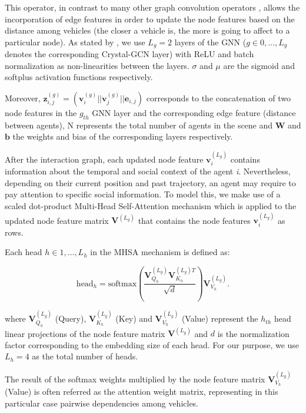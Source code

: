 This operator, in contrast to many other graph convolution operators \cite{zeng2021lanercnn} \cite{liang2020learning}, allows the incorporation of edge features in order to update the node features based on the distance among vehicles (the closer a vehicle is, the more is going to affect to a particular node). As stated by \cite{schmidt2022crat}, we use $L_g = 2$ layers of the GNN ($g \in 0, \dots , L_g$ denotes the corresponding Crystal-GCN layer) with ReLU and batch normalization as non-linearities between the layers. $\sigma$ and $\mu$ are the sigmoid and softplus activation functions respectively. 

Moreover, $\mathbf{z}_{i,j}^{(g)} = ( \mathbf{v}_i^{(g)} || \mathbf{v}_j^{(g)} ||\mathbf{e}_{i,j} )$ corresponds to the concatenation of two node features in the \textit{$g_{th}$} GNN layer and the corresponding edge feature (distance between agents), N represents the total number of agents in the scene and $\mathbf{W}$ and $\mathbf{b}$ the weights and bias of the corresponding layers respectively.

After the interaction graph, each updated node feature $\mathbf{v}_i^{(L_g)}$ contains information about the temporal and social context of the agent \textit{i}. Nevertheless, depending on their current position and past trajectory, an agent may require to pay attention to specific social information. To model this, we make use of a scaled dot-product Multi-Head Self-Attention mechanism \cite{vaswani2017attention} which is applied to the updated node feature matrix $\mathbf{V}^{(L_g)}$ that contains the node features $\mathbf{v}_i^{(L_g)}$ as rows. 

Each head $h \in 1,\dots, L_h$ in the MHSA mechanism is defined as:

\begin{equation}
	\mathrm{head}_h = \mathrm{softmax} \left( \frac{\mathbf{V}^{(L_g)}_{Q_h} \mathbf{V}^{(L_g) T}_{K_h}}{\sqrt{d}}  \right) \mathbf{V}^{(L_g)}_{V_h} \text{.}
\end{equation}

where $\mathbf{V}^{(L_g)}_{Q_h}$ (Query), $\mathbf{V}^{(L_g)}_{K_h}$ (Key) and $\mathbf{V}^{(L_g)}_{V_h}$ (Value) represent the \textit{$h_{th}$} head linear projections of the node feature matrix $\mathbf{V}^{(L_g)}$ and $d$ is the normalization factor corresponding to the embedding size of each head. For our purpose, we use $L_h = 4$ as the total number of heads. 

The result of the softmax weights multiplied by the node feature matrix $\mathbf{V}^{(L_g)}_{V_h}$ (Value) is often referred as the attention weight matrix, representing in this particular case pairwise dependencies among vehicles.

